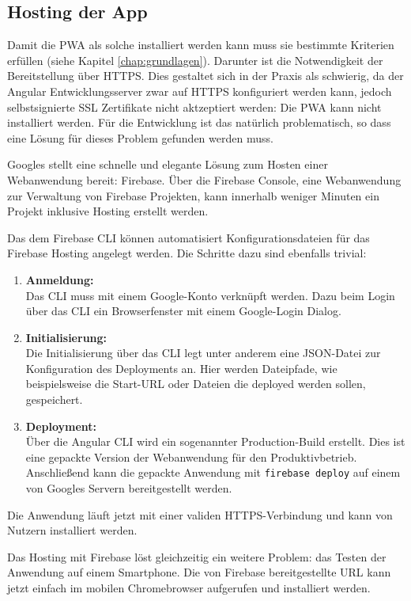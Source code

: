 \subsection{Hosting der App}
Damit die PWA als solche installiert werden kann muss sie bestimmte Kriterien erfüllen (siehe Kapitel \ref{chap:grundlagen}). Darunter ist die Notwendigkeit der Bereitstellung über HTTPS. Dies gestaltet sich in der Praxis als schwierig, da der Angular Entwicklungsserver zwar auf HTTPS konfiguriert werden kann, jedoch selbstsignierte SSL Zertifikate nicht aktzeptiert werden: Die PWA kann nicht installiert werden. Für die Entwicklung ist das natürlich problematisch, so dass eine Lösung für dieses Problem gefunden werden muss.

Googles stellt eine schnelle und elegante Lösung zum Hosten einer Webanwendung bereit: Firebase. Über die Firebase Console, eine Webanwendung zur Verwaltung von Firebase Projekten, kann innerhalb weniger Minuten ein Projekt inklusive Hosting erstellt werden.

Das dem Firebase CLI können automatisiert Konfigurationsdateien für das Firebase Hosting angelegt werden. Die Schritte dazu sind ebenfalls trivial:
\begin{enumerate}
	\item \textbf{Anmeldung: \\}
	      Das CLI muss mit einem Google-Konto verknüpft werden. Dazu beim Login über das CLI ein Browserfenster mit einem Google-Login Dialog.
	\item \textbf{Initialisierung: \\}
	      Die Initialisierung über das CLI legt unter anderem eine JSON-Datei zur Konfiguration des Deployments an. Hier werden Dateipfade, wie beispielsweise die Start-URL oder Dateien die deployed werden sollen, gespeichert.
	\item \textbf{Deployment: \\}
	      Über die Angular CLI wird ein sogenannter Production-Build erstellt. Dies ist eine gepackte Version der Webanwendung für den Produktivbetrieb.
	      Anschließend kann die gepackte Anwendung mit \texttt{firebase deploy} auf einem von Googles Servern bereitgestellt werden.
\end{enumerate}

Die Anwendung läuft jetzt mit einer validen HTTPS-Verbindung und kann von Nutzern installiert werden.

Das Hosting mit Firebase löst gleichzeitig ein weitere Problem: das Testen der Anwendung auf einem Smartphone. Die von Firebase bereitgestellte URL kann jetzt einfach im mobilen Chromebrowser aufgerufen und installiert werden.

